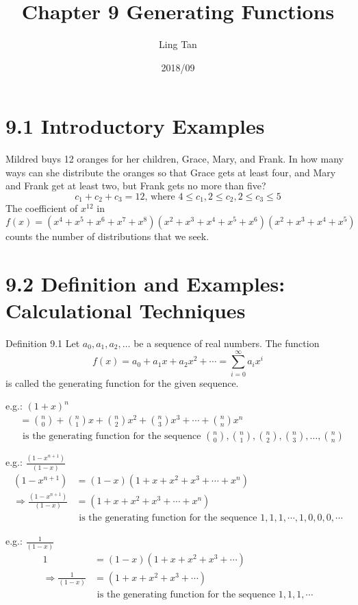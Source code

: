 \documentclass[a4paper]{article}
\title{Chapter 9 Generating Functions}
\author{Ling Tan}
\date{2018/09}
\begin{document}
\maketitle

\section*{9.1 Introductory Examples}
Mildred buys 12 oranges for her children, Grace, Mary, and Frank. In how many ways can she distribute the oranges so that Grace gets at least four, and Mary and Frank get at least two, but Frank gets no more than five?
$$c_1+c_2+c_3=12\text{, where } 4\leq c_1, 2\leq c_2, 2\leq c_3\leq 5$$
The coefficient of $x^{12}$ in 
$$f(x)=(x^4+x^5+x^6+x^7+x^8)(x^2+x^3+x^4+x^5+x^6)(x^2+x^3+x^4+x^5)$$
counts the number of distributions that we seek.

\section*{9.2 Definition and Examples: Calculational Techniques}
\color{green}Definition 9.1 \color{black} Let $a_0,a_1,a_2,\ldots$ be a sequence of real numbers. The function
$$f(x)=a_0+a_1x+a_2x^2+\cdots=\sum_{i=0}^{\infty}{a_ix^i}$$
is called the generating function for the given sequence.

\color{red}e.g.: \color{black} $(1+x)^n$
\begin{align*}
    &=\binom{n}{0}+\binom{n}{1}x+\binom{n}{2}x^2+\binom{n}{3}x^3+\cdots+\binom{n}{n}x^n\\
    &\text{ is the generating function for the sequence } \binom{n}{0},\binom{n}{1},\binom{n}{2},\binom{n}{3},\ldots,\binom{n}{n}
\end{align*}

\color{red}e.g.: \color{black} $\frac{(1-x^{n+1})}{(1-x)}$
\begin{align*}
    (1-x^{n+1})&=(1-x)(1+x+x^2+x^3+\cdots+x^n)\\
    \Rightarrow \frac{(1-x^{n+1})}{(1-x)}&=(1+x+x^2+x^3+\cdots+x^n)\\
    &\text{ is the generating function for the sequence } 1,1,1,\cdots,1,0,0,0,\cdots
\end{align*}

\color{red}e.g.: \color{black} $\frac{1}{(1-x)}$
\begin{align*}
    1&=(1-x)(1+x+x^2+x^3+\cdots)\\
    \Rightarrow \frac{1}{(1-x)}&=(1+x+x^2+x^3+\cdots)\\
    &\text{ is the generating function for the sequence } 1,1,1,\cdots
\end{align*}
\end{document}
